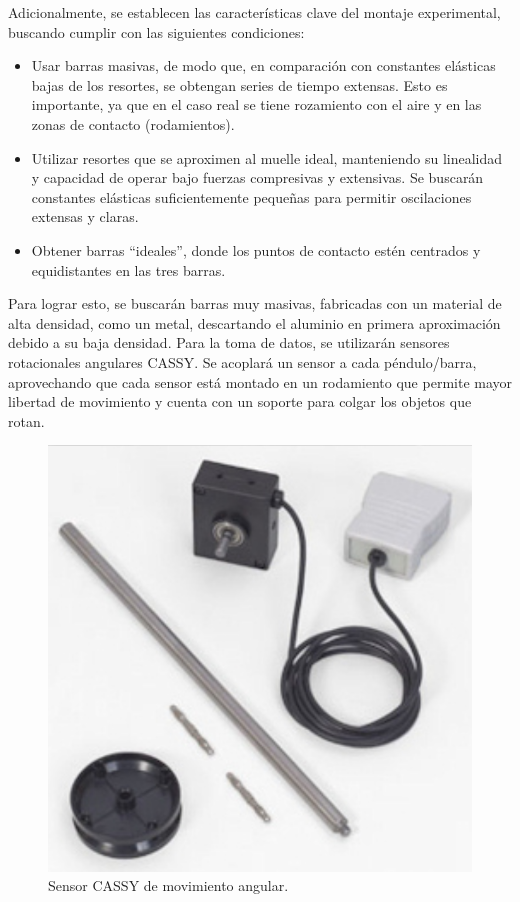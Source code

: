 Adicionalmente, se establecen las características clave del montaje
experimental, buscando cumplir con las siguientes condiciones:

\begin{itemize}
  \item Usar barras masivas, de modo que, en comparación con
    constantes elásticas bajas de los resortes, se obtengan series
    de tiempo extensas. Esto es importante, ya que en el caso real
    se tiene rozamiento con el aire y en las zonas de contacto
    (rodamientos).
  \item Utilizar resortes que se aproximen al muelle ideal,
    manteniendo su linealidad y capacidad de operar bajo fuerzas
    compresivas y extensivas. Se buscarán constantes elásticas
    suficientemente pequeñas para permitir oscilaciones extensas y
    claras.
  \item Obtener barras ``ideales'', donde los puntos de contacto
    estén centrados y equidistantes en las tres barras.
\end{itemize}

Para lograr esto, se buscarán barras muy masivas, fabricadas con
un material de alta densidad, como un metal, descartando el aluminio
en primera aproximación debido a su baja densidad. Para la toma de
datos, se utilizarán sensores rotacionales angulares CASSY. Se
acoplará un sensor a cada péndulo/barra, aprovechando que cada sensor
está montado en un rodamiento que permite mayor libertad de
movimiento y cuenta con un soporte para colgar los objetos que rotan.

\begin{figure}[htbp!]
  \centering
  \includegraphics[width=0.5\linewidth]{Figures/IM2.png}
  \caption{Sensor CASSY de movimiento angular.}
  \label{fig:cassy}
\end{figure}
